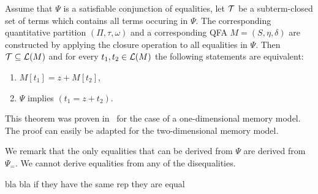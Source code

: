 
\begin{theorem}
  Assume that $\Psi$ is a satisfiable conjunction of equalities, let $\mathcal{T}$ be a subterm-closed set of terms which contains all terms occuring in $\Psi$.
  The corresponding quantitative partition $(\Pi, \tau,\omega)$ and a corresponding QFA $M = (S, \eta, \delta)$ are constructed by applying the closure operation to all equalities in $\Psi$.
  Then $\mathcal{T} \subseteq \mathcal{L}(M)$ and for every $t_1, t_2 \in \mathcal{L}(M)$ the following statements are equivalent:
  \begin{enumerate}
    \item $M[t_1] = z + M[t_2]$,
    \item $\Psi$ implies $(t_1 = z + t_2)$.
  \end{enumerate}
\end{theorem}

This theorem was proven in~\cite{2pointer} for the case of a one-dimensional memory model.
The proof can easily be adapted for the two-dimensional memory model.

We remark that the only equalities that can be derived from $\Psi$ are derived from $\Psi_=$. We cannot derive equalities from any of the disequalities.

bla bla if they have the same rep they are equal
